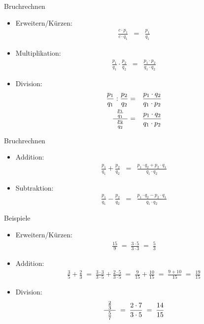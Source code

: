 \documentclass[german]{beamer}
\newcommand{\bq}{\begin{eqnarray*}}
\newcommand{\eq}{\end{eqnarray*}}
\begin{document}
\begin{frame}{Bruchrechnen}

\begin{itemize}

\item Erweitern/K\"urzen:
\bq
 \frac{c \cdot p_1}{c \cdot q_1} & = & \frac{p_1}{q_1}
\eq

\item Multiplikation:
\bq
 \frac{p_1}{q_1} \cdot \frac{p_2}{q_2} & = & \frac{p_1 \cdot p_2}{q_1 \cdot q_2}
\eq

\item Division:
\bq
 \frac{p_1}{q_1} : \frac{p_2}{q_2} & = & \frac{p_1 \cdot q_2}{q_1 \cdot p_2}
 \nonumber \\
 \frac{\hphantom{a} \frac{p_1}{q_1} \hphantom{a} }{\frac{p_2}{q_2}} & = & \frac{p_1 \cdot q_2}{q_1 \cdot p_2}
\eq

\end{itemize}

\end{frame}

\begin{frame}{Bruchrechnen}

\begin{itemize}

\item Addition:
\bq
 \frac{p_1}{q_1} + \frac{p_2}{q_2} & = & \frac{p_1 \cdot q_2 + p_2 \cdot q_1}{q_1 \cdot q_2}
\eq

\item Subtraktion:
\bq
 \frac{p_1}{q_1} - \frac{p_2}{q_2} & = & \frac{p_1 \cdot q_2 - p_2 \cdot q_1}{q_1 \cdot q_2}
\eq

\end{itemize}

\end{frame}

\begin{frame}{Beispiele}

\begin{itemize}

\item Erweitern/K\"urzen:
\bq
 \frac{15}{9} \; = \; \frac{3 \cdot 5}{3 \cdot 3} \; = \; \frac{5}{3}
\eq

\item Addition:
\bq
 \frac{3}{5} + \frac{2}{3} 
 \; = \;
 \frac{3 \cdot 3}{3 \cdot 5} + \frac{2 \cdot 5}{3 \cdot 5} 
 \; = \;
 \frac{9}{15} + \frac{10}{15} 
 \; = \;
 \frac{9+10}{15}
 \; = \;
 \frac{19}{15}
\eq

\item Division:
\bq
 \frac{\hphantom{a} \frac{2}{3} \hphantom{a} }{\frac{5}{7}} 
 \; = \; 
 \frac{2 \cdot 7}{3 \cdot 5}
 \; = \; 
 \frac{14}{15}
\eq

\end{itemize}

\end{frame}
\end{document}
